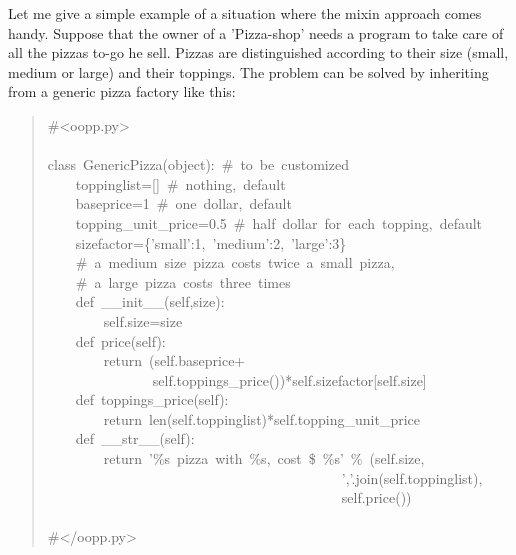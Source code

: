\documentclass[10pt,english]{article}
\begin{document}
Let me give a simple example of a situation where the mixin approach 
comes handy. Suppose that the owner of a 'Pizza-shop' needs a program to 
take care of all the pizzas to-go he sell. Pizzas are distinguished 
according to their size (small, medium or large) and their toppings. 
The problem can be solved by inheriting from a generic pizza factory
like this:
\begin{quote}
\begin{ttfamily}\begin{flushleft}
\mbox{{\#}<oopp.py>}\\
\mbox{}\\
\mbox{class~GenericPizza(object):~{\#}~to~be~customized}\\
\mbox{~~~~toppinglist=[]~{\#}~nothing,~default~}\\
\mbox{~~~~baseprice=1~{\#}~one~dollar,~default}\\
\mbox{~~~~topping{\_}unit{\_}price=0.5~{\#}~half~dollar~for~each~topping,~default}\\
\mbox{~~~~sizefactor={\{}'small':1,~'medium':2,~'large':3{\}}~}\\
\mbox{~~~~{\#}~a~medium~size~pizza~costs~twice~a~small~pizza,~}\\
\mbox{~~~~{\#}~a~large~pizza~costs~three~times}\\
\mbox{~~~~def~{\_}{\_}init{\_}{\_}(self,size):}\\
\mbox{~~~~~~~~self.size=size}\\
\mbox{~~~~def~price(self):}\\
\mbox{~~~~~~~~return~(self.baseprice+}\\
\mbox{~~~~~~~~~~~~~~~self.toppings{\_}price())*self.sizefactor[self.size]}\\
\mbox{~~~~def~toppings{\_}price(self):}\\
\mbox{~~~~~~~~return~len(self.toppinglist)*self.topping{\_}unit{\_}price}\\
\mbox{~~~~def~{\_}{\_}str{\_}{\_}(self):}\\
\mbox{~~~~~~~~return~'{\%}s~pizza~with~{\%}s,~cost~{\$}~{\%}s'~{\%}~(self.size,}\\
\mbox{~~~~~~~~~~~~~~~~~~~~~~~~~~~~~~~~~~~~~~~~~~','.join(self.toppinglist),}\\
\mbox{~~~~~~~~~~~~~~~~~~~~~~~~~~~~~~~~~~~~~~~~~~self.price())}\\
\mbox{}\\
\mbox{{\#}</oopp.py>}
\end{flushleft}\end{ttfamily}
\end{quote}
\end{document}
